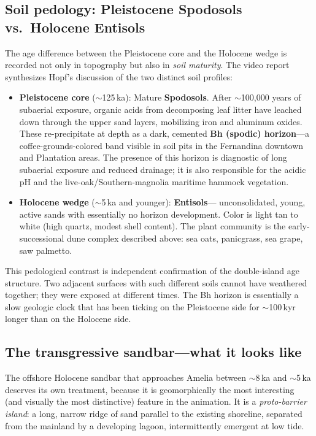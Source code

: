 \documentclass[11pt]{article}
\begin{document}
\subsection{Soil pedology: Pleistocene Spodosols vs.\ Holocene Entisols}

The age difference between the Pleistocene core and the Holocene wedge
is recorded not only in topography but also in \emph{soil maturity}.
The video report \cite{cn_hopf_videoreport} synthesizes Hopf's discussion
of the two distinct soil profiles:

\begin{itemize}[leftmargin=2em]
\item \textbf{Pleistocene core} ($\sim$125\,ka): Mature \textbf{Spodosols}.
After $\sim$100{,}000 years of subaerial exposure, organic acids from
decomposing leaf litter have leached down through the upper sand layers,
mobilizing iron and aluminum oxides. These re-precipitate at depth as a
dark, cemented \textbf{Bh (spodic) horizon}---a coffee-grounds-colored
band visible in soil pits in the Fernandina downtown and Plantation
areas. The presence of this horizon is diagnostic of long subaerial
exposure and reduced drainage; it is also responsible for the acidic
pH and the live-oak/Southern-magnolia maritime hammock vegetation.
\item \textbf{Holocene wedge} ($\sim$5\,ka and younger): \textbf{Entisols}---
unconsolidated, young, active sands with essentially no horizon
development. Color is light tan to white (high quartz, modest shell
content). The plant community is the early-successional dune complex
described above: sea oats, panicgrass, sea grape, saw palmetto.
\end{itemize}

\noindent This pedological contrast is independent confirmation of the
double-island age structure. Two adjacent surfaces with such different
soils cannot have weathered together; they were exposed at different
times. The Bh horizon is essentially a slow geologic clock that has
been ticking on the Pleistocene side for $\sim$100\,kyr longer than on
the Holocene side.

\subsection{The transgressive sandbar---what it looks like}

The offshore Holocene sandbar that approaches Amelia between $\sim$8\,ka
and $\sim$5\,ka deserves its own treatment, because it is geomorphically
the most interesting (and visually the most distinctive) feature in the
animation. It is a \emph{proto-barrier island}: a long, narrow ridge of
sand parallel to the existing shoreline, separated from the mainland by
a developing lagoon, intermittently emergent at low tide.
\end{document}
